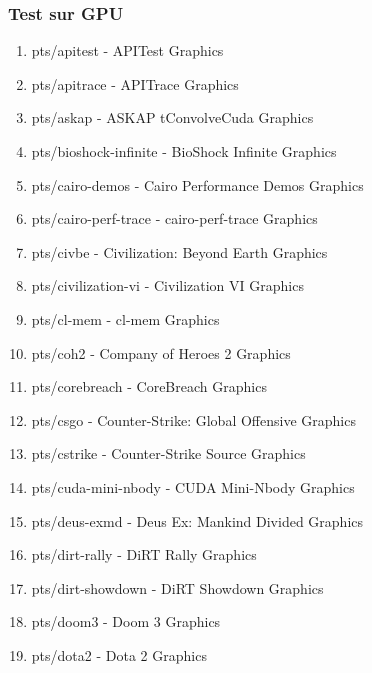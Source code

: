 \documentclass[french]{article}
\begin{document}
\subsubsection{Test sur GPU}
\begin{enumerate}

\item pts/apitest                    - APITest                             Graphics 
\item pts/apitrace                   - APITrace                            Graphics 
\item pts/askap                      - ASKAP tConvolveCuda                 Graphics 
\item pts/bioshock-infinite          - BioShock Infinite                   Graphics 
\item pts/cairo-demos                - Cairo Performance Demos             Graphics 
\item pts/cairo-perf-trace           - cairo-perf-trace                    Graphics 
\item pts/civbe                      - Civilization: Beyond Earth          Graphics 
\item pts/civilization-vi            - Civilization VI                     Graphics 
\item pts/cl-mem                     - cl-mem                              Graphics 
\item pts/coh2                       - Company of Heroes 2                 Graphics 
\item pts/corebreach                 - CoreBreach                          Graphics 
\item pts/csgo                       - Counter-Strike: Global Offensive    Graphics 
\item pts/cstrike                    - Counter-Strike Source               Graphics 
\item pts/cuda-mini-nbody            - CUDA Mini-Nbody                     Graphics 
\item pts/deus-exmd                  - Deus Ex: Mankind Divided            Graphics 
\item pts/dirt-rally                 - DiRT Rally                          Graphics 
\item pts/dirt-showdown              - DiRT Showdown                       Graphics 
\item pts/doom3                      - Doom 3                              Graphics 
\item pts/dota2                      - Dota 2                              Graphics 

\end{enumerate}
\end{document}
